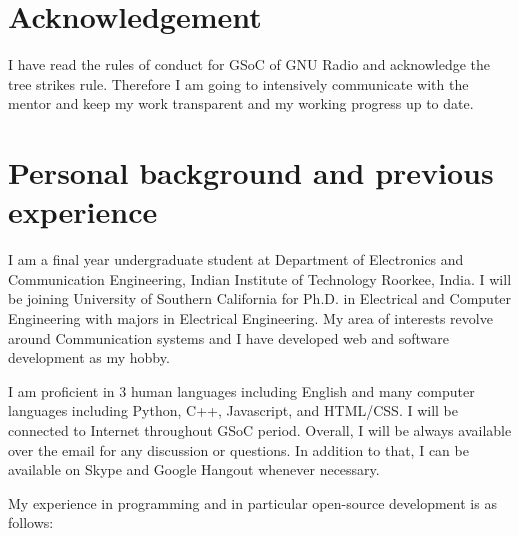 \documentclass[a4paper, 11pt]{article}
\begin{document}
\section{Acknowledgement}
I have read the rules of conduct for GSoC of GNU Radio and acknowledge the tree strikes rule. Therefore I am going to intensively communicate with the mentor and keep my work transparent and my working progress up to date.

\section{Personal background and previous experience}
I am a final year undergraduate student at Department of Electronics and Communication Engineering, Indian Institute of Technology Roorkee, India. I will be joining University of Southern California for Ph.D. in Electrical and Computer Engineering with majors in Electrical Engineering. My area of interests revolve around Communication systems and I have developed web and software development as my hobby.

I am proficient in 3 human languages including English and  many computer languages including Python, C++, Javascript, and HTML/CSS. I will be connected to Internet throughout GSoC period. Overall, I will be always available over the email for any discussion or questions. In addition to that, I can be available on Skype and Google Hangout whenever necessary.



My experience in programming and in particular open-source development is as follows:
\end{document}
